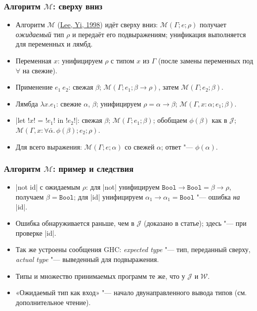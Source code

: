 \documentclass[11pt]{beamer}
\newcommand{\tBool}{\mathtt{Bool}}
\newcommand{\J}{\mathcal{J}}
\newcommand{\Malg}{\mathcal{M}}
\begin{document}
\begin{frame}[fragile]
  \frametitle{Алгоритм $\Malg$: сверху вниз}
  \begin{itemize}
    \item Алгоритм $\Malg$ (\href{https://ropas.snu.ac.kr/~kwang/paper/98-toplas-leyi.pdf}{Lee, Yi, 1998}) идёт сверху вниз: $\Malg(\Gamma; e; \rho)$ получает \emph{ожидаемый} тип $\rho$ и передаёт его подвыражениям; унификация выполняется для переменных и лямбд.
          \pause
    \item Переменная $x$: унифицируем $\rho$ с типом $x$ из $\Gamma$ (после замены переменных под $\forall$ на свежие).
    \item Применение $e_1~e_2$: свежая $\beta$; $\Malg(\Gamma; e_1; \beta \to \rho)$, затем $\Malg(\Gamma; e_2; \beta)$.
    \item Лямбда $\lambda x.e_1$: свежие $\alpha$, $\beta$; унифицируем $\rho = \alpha \to \beta$; $\Malg(\Gamma, x : \alpha; e_1; \beta)$.
    \item \haskinline|let !$x$! = !$e_1$! in !$e_2$!|: свежая $\beta$; $\Malg(\Gamma; e_1; \beta)$; обобщаем $\phi(\beta)$ как в $\J$; $\Malg(\Gamma, x : \forall\bar\alpha.\,\phi(\beta); e_2; \rho)$.
    \item Для всего выражения: $\Malg(\Gamma; e; \alpha)$ со свежей $\alpha$; ответ "--- $\phi(\alpha)$.
  \end{itemize}
\end{frame}

\begin{frame}[fragile]
  \frametitle{Алгоритм $\Malg$: пример и следствия}
  \begin{itemize}
    \item \haskinline|not id| с ожидаемым $\rho$: для \haskinline|not| унифицируем $\tBool \to \tBool = \beta \to \rho$, получаем $\beta = \tBool$; для \haskinline|id| унифицируем $\alpha_1 \to \alpha_1 = \tBool$ "--- ошибка \emph{на} \haskinline|id|.
          \pause
    \item Ошибка обнаруживается раньше, чем в $\J$ (доказано в статье); здесь "--- при проверке \haskinline|id|.
    \item Так же устроены сообщения GHC: \emph{expected type} "--- тип, переданный сверху, \emph{actual type} "--- выведенный для подвыражения.
          \pause
    \item Типы и множество принимаемых программ те же, что у $\J$ и $\mathcal{W}$.
    \item «Ожидаемый тип как вход» "--- начало двунаправленного вывода типов (см. дополнительное чтение).
  \end{itemize}
\end{frame}
\end{document}
